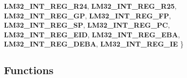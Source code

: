 \begin{DoxyCompactItemize}
{\bfseries L\+M32\+\_\+\+I\+N\+T\+\_\+\+R\+E\+G\+\_\+\+R24}, 
{\bfseries L\+M32\+\_\+\+I\+N\+T\+\_\+\+R\+E\+G\+\_\+\+R25}, 
\newline
{\bfseries L\+M32\+\_\+\+I\+N\+T\+\_\+\+R\+E\+G\+\_\+\+GP}, 
{\bfseries L\+M32\+\_\+\+I\+N\+T\+\_\+\+R\+E\+G\+\_\+\+FP}, 
{\bfseries L\+M32\+\_\+\+I\+N\+T\+\_\+\+R\+E\+G\+\_\+\+SP}, 
{\bfseries L\+M32\+\_\+\+I\+N\+T\+\_\+\+R\+E\+G\+\_\+\+PC}, 
\newline
{\bfseries L\+M32\+\_\+\+I\+N\+T\+\_\+\+R\+E\+G\+\_\+\+E\+ID}, 
{\bfseries L\+M32\+\_\+\+I\+N\+T\+\_\+\+R\+E\+G\+\_\+\+E\+BA}, 
{\bfseries L\+M32\+\_\+\+I\+N\+T\+\_\+\+R\+E\+G\+\_\+\+D\+E\+BA}, 
{\bfseries L\+M32\+\_\+\+I\+N\+T\+\_\+\+R\+E\+G\+\_\+\+IE}
 \}
\end{DoxyCompactItemize}
\subsection*{Functions}
